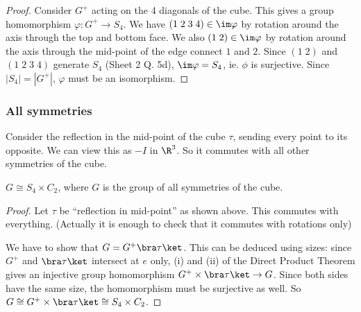 \documentclass[a4paper]{article}
\begin{document}
  \begin{proof}
    Consider $G^+$ acting on the 4 diagonals of the cube. This gives a group homomorphism $\varphi: G^+ \to S_4$. We have $(1\; 2\; 3\; 4)\in\im \varphi$ by rotation around the axis through the top and bottom face. We also $(1\; 2)\in \im \varphi$ by rotation around the axis through the mid-point of the edge connect $1$ and $2$. Since $(1\; 2)$ and $(1\; 2\; 3\; 4)$ generate $S_4$ (Sheet 2 Q. 5d), $\im\varphi = S_4$, ie. $\phi$ is surjective. Since $|S_4| = |G^+|$, $\varphi$ must be an isomorphism.
  \end{proof}

  \subsubsection{All symmetries}
  Consider the reflection in the mid-point of the cube $\tau$, sending every point to its opposite. We can view this as $-I$ in $\R^3$. So it commutes with all other symmetries of the cube.
  \begin{prop}
    $G \cong S_4\times C_2$, where $G$ is the group of all symmetries of the cube.
  \end{prop}

  \begin{proof}
    Let $\tau$ be ``reflection in mid-point'' as shown above. This commutes with everything. (Actually it is enough to check that it commutes with rotations only)

    We have to show that $G = G^+\bra \tau\ket$. This can be deduced using sizes: since $G^+$ and $\bra\tau\ket$ intersect at $e$ only, (i) and (ii) of the Direct Product Theorem gives an injective group homomorphism $G^+\times \bra\tau\ket \to G$. Since both sides have the same size, the homomorphism must be surjective as well. So $G\cong G^+\times \bra \tau\ket \cong S_4\times C_2$. 
  \end{proof}
\end{document}
